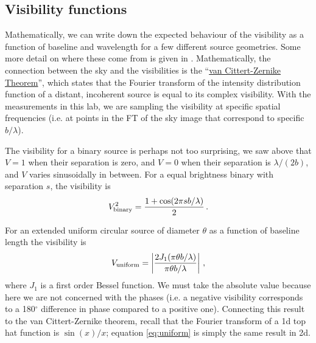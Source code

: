 \documentclass[11pt]{article}
\begin{document}
\subsection{Visibility functions}

Mathematically, we can write down the expected behaviour of the visibility as a function of baseline and wavelength for a few different source geometries. Some more detail on where these come from is given in \citet[][e.g. Fig 2.13]{2011psi..book.....G}. Mathematically, the connection between the sky and the visibilities is the ``\href{https://en.wikipedia.org/wiki/Van_Cittert%E2%80%93Zernike_theorem}{van Cittert-Zernike Theorem}'', which states that the Fourier transform of the intensity distribution function of a distant, incoherent source is equal to its complex visibility. With the measurements in this lab, we are sampling the visibility at specific spatial frequencies (i.e. at points in the FT of the sky image that correspond to specific $b/\lambda$).

The visibility for a binary source is perhaps not too surprising, we saw above that $V=1$ when their separation is zero, and $V=0$ when their separation is $\lambda/(2b)$, and $V$ varies sinusoidally in between. For a equal brightness binary with separation $s$, the visibility is
\begin{equation}
    V^2_{\rm binary} = \frac{1 + \cos ( 2 \pi s b / \lambda )}{2} \, .
\end{equation}

For an extended uniform circular source of diameter $\theta$ as a function of baseline length the visibility is
\begin{equation}\label{eq:uniform}
    V_{\rm uniform} =  \left\vert \frac{2 J_1(\pi \theta b / \lambda)}{\pi \theta b / \lambda} \right\vert \, ,
\end{equation}
where $J_1$ is a first order Bessel function. We must take the absolute value because here we are not concerned with the phases (i.e. a negative visibility corresponds to a 180$^\circ$ difference in phase compared to a positive one). Connecting this result to the van Cittert-Zernike theorem, recall that the Fourier transform of a 1d top hat function is $\sin(x)/x$; equation \ref{eq:uniform} is simply the same result in 2d.
\end{document}
